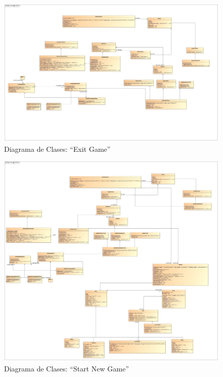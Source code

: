 \documentclass[11pt]{article}
\begin{document}
\begin{landscape}
\begin{center}
 \begin{figure}[H]
 \begin{center}
 \includegraphics[scale=0.32]{Analysis/ExitGame00.jpg}
   \caption{Diagrama de Clases: ``Exit Game''}
   \label{fig:exitgame}
 \end{center}
 \end{figure}
\end{center}
\end{landscape}
\restoregeometry

\begin{landscape}
\begin{center}
 \begin{figure}[H]
 \begin{center}
 \includegraphics[scale=0.22]{Analysis/ResetGame00.jpg}
   \caption{Diagrama de Clases: ``Start New Game''}
   \label{fig:resetgame}
 \end{center}
 \end{figure}
\end{center}
\end{landscape}
\restoregeometry
\end{document}
